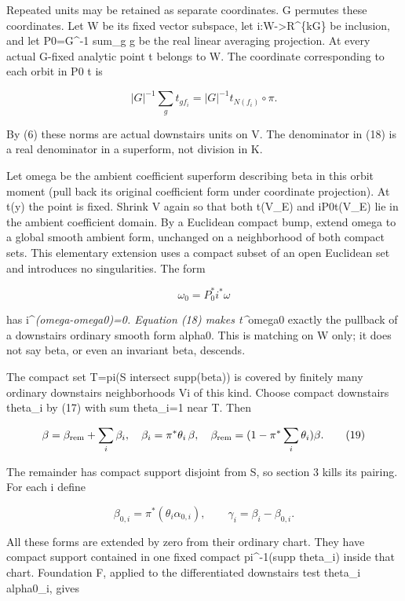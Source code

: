 \documentclass[
  10pt,
]{article}
\begin{document}
Repeated units may be retained as separate coordinates. G permutes these
coordinates. Let W be its fixed vector subspace, let
i:W-\textgreater R\^{}\{k\textbar G\textbar\} be inclusion, and let
P0=\textbar G\textbar\^{}-1 sum\_g g be the real linear averaging
projection. At every actual G-fixed analytic point t belongs to W. The
coordinate corresponding to each orbit in P0 t is

\[
 |G|^{-1}\sum_g t_{g f_i}=|G|^{-1}t_{N(f_i)}\circ\pi.       \tag{18}
\]

By (6) these norms are actual downstairs units on V. The denominator in
(18) is a real denominator in a superform, not division in K.

Let omega be the ambient coefficient superform describing beta in this
orbit moment (pull back its original coefficient form under coordinate
projection). At t(y) the point is fixed. Shrink V again so that both
t(V\_E) and iP0t(V\_E) lie in the ambient coefficient domain. By a
Euclidean compact bump, extend omega to a global smooth ambient form,
unchanged on a neighborhood of both compact sets. This elementary
extension uses a compact subset of an open Euclidean set and introduces
no singularities. The form

\[
 \omega_0=P_0^*i^*\omega
\]

has i\^{}\emph{(omega-omega0)=0. Equation (18) makes t\^{}}omega0
exactly the pullback of a downstairs ordinary smooth form alpha0. This
is matching on W only; it does not say beta, or even an invariant beta,
descends.

The compact set T=pi(S intersect supp(beta)) is covered by finitely many
ordinary downstairs neighborhoods Vi of this kind. Choose compact
downstairs theta\_i by (17) with sum theta\_i=1 near T. Then

\[
 \beta=\beta_{\rm rem}+\sum_i\beta_i,
 \quad \beta_i=\pi^*\theta_i\,\beta,
 \quad \beta_{\rm rem}=(1-\pi^*\sum_i\theta_i)\beta.          \tag{19}
\]

The remainder has compact support disjoint from S, so section 3 kills
its pairing. For each i define

\[
 \beta_{0,i}=\pi^*(\theta_i\alpha_{0,i}),
 \qquad \gamma_i=\beta_i-\beta_{0,i}.                        \tag{20}
\]

All these forms are extended by zero from their ordinary chart. They
have compact support contained in one fixed compact pi\^{}-1(supp
theta\_i) inside that chart. Foundation F, applied to the differentiated
downstairs test theta\_i alpha0\_i, gives
\end{document}
